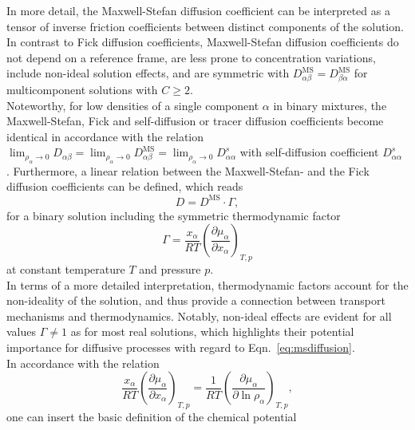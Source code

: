 \documentclass[aip,jcp,reprint]{revtex4-1}
\begin{document}
In more detail, the Maxwell-Stefan diffusion coefficient can be interpreted as a tensor of  inverse friction coefficients between distinct  components of the solution. In contrast to Fick diffusion coefficients, Maxwell-Stefan diffusion coefficients do not depend on a reference frame, are  less prone to concentration variations, include non-ideal solution effects, and  are symmetric with $D_{\alpha\beta}^{\text{MS}}=D_{\beta\alpha}^{\text{MS}}$ for multicomponent solutions with $C\geq 2$.\\ Noteworthy, for low densities of a single component $\alpha$  in binary mixtures, the Maxwell-Stefan, Fick and self-diffusion or tracer diffusion coefficients become identical  in accordance with the relation\cite{liu13a}  $\lim_{\rho_{\alpha}\rightarrow 0}D_{\alpha\beta}=\lim_{\rho_{\alpha}\rightarrow 0}D_{\alpha\beta}^{\text{MS}} = \lim_{\rho_{\alpha}\rightarrow 0} D_{\alpha\alpha}^s$  with self-diffusion coefficient $D_{\alpha\alpha}^s$ \cite{bardow15a,liu11a,liu13a}.
Furthermore, a linear relation between the Maxwell-Stefan- and the Fick diffusion coefficients can be defined, which reads 
\begin{equation}
\label{eq:msdiffusion}
D= D^{\text{MS}}\cdot \Gamma,
\end{equation}
for a binary solution \cite{taylor93a,balsara15a,janzen17a}  including  the symmetric thermodynamic factor\cite{guevara16a,janzen17a,lecce17a}
\begin{equation}
\label{eq:thermodyn_fact}
\Gamma=\frac{x_{\alpha}}{RT}\left(\frac{\partial \mu_{\alpha}}{\partial x_{\alpha}}\right)_{T,p}
\end{equation}
at constant temperature $T$ and pressure $p$.\\
In terms of a more detailed interpretation, thermodynamic factors account for the non-ideality of the solution, and thus provide a connection between transport mechanisms and thermodynamics.  Notably, non-ideal effects are  evident for all values $\Gamma \neq 1$ as for most real solutions, which highlights their potential importance for diffusive processes with regard to Eqn.~\eqref{eq:msdiffusion}.\\
In accordance with the relation
\begin{equation}
\label{eq:Gamma}
\frac{x_{\alpha}}{RT}\left(\frac{\partial \mu_{\alpha}}{\partial x_{\alpha}}\right)_{T,p} = \frac{1}{RT}\left(\frac{\partial \mu_{\alpha}}{\partial \ln \rho_{\alpha}}\right)_{T,p},
\end{equation}
one can insert the basic definition of the chemical potential
\end{document}
